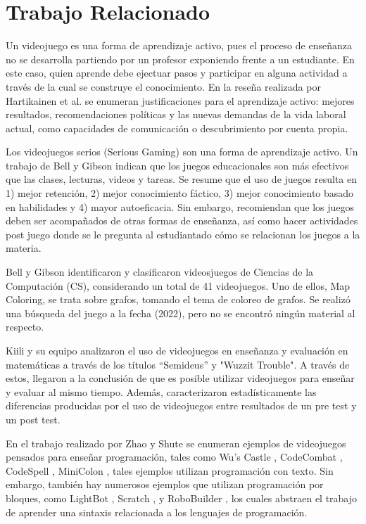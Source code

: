 \chapter{Trabajo Relacionado}


Un videojuego es una forma de aprendizaje activo, pues el proceso de enseñanza no se desarrolla partiendo por un profesor exponiendo frente a un estudiante. En este caso, quien aprende debe ejectuar pasos y participar en alguna actividad a través de la cual se construye el conocimiento. En la reseña realizada por Hartikainen et al. \cite{active_learning_review} se enumeran justificaciones para el aprendizaje activo:  mejores resultados, recomendaciones políticas y las nuevas demandas de la vida laboral actual, como capacidades de comunicación o descubrimiento por cuenta propia. 

Los videojuegos serios (Serious Gaming) son una forma de aprendizaje activo. Un trabajo de Bell y Gibson \cite{evaluation_of_games_for_teaching_cs} indican que los juegos educacionales son más efectivos que las clases, lecturas, videos y tareas. Se resume que el uso de juegos resulta en 1) mejor retención, 2) mejor conocimiento fáctico, 3) mejor conocimiento basado en habilidades y 4) mayor autoeficacia. Sin embargo, recomiendan que los juegos  deben ser acompañados de otras formas de enseñanza, así como hacer actividades post juego donde se le pregunta al estudiantado cómo se relacionan los juegos a la materia.

Bell y Gibson \cite{evaluation_of_games_for_teaching_cs} identificaron y clasificaron videosjuegos de Ciencias de la Computación (CS), considerando un total de 41 videojuegos. Uno de ellos, Map Coloring, se trata sobre grafos, tomando el tema de coloreo de grafos. Se realizó una búsqueda del juego a la fecha (2022), pero no se encontró ningún material al respecto.

Kiili y su equipo \cite{using_videogames_maths} analizaron el uso de videojuegos en enseñanza y evaluación en matemáticas a través de los títulos ``Semideus'' y "Wuzzit Trouble". A través de estos, llegaron a la conclusión de que es posible utilizar videojuegos para enseñar y evaluar al mismo tiempo. Además, caracterizaron estadísticamente las diferencias producidas por el uso de videojuegos entre resultados de un pre test y un post test.

En el trabajo realizado por Zhao y Shute \cite{video_game_foster_computational_thinking} se enumeran ejemplos de videojuegos pensados para enseñar programación, tales como Wu's Castle \cite{wuscastle}, CodeCombat \cite{CodeCombat}, CodeSpell \cite{codespells}, MiniColon \cite{minicolon}, tales ejemplos utilizan programación con texto. Sin embargo, también hay numerosos ejemplos que utilizan programación por bloques, como LightBot \cite{LightBot}, Scratch \cite{maloney2010scratch}, \cite{scratch} y RoboBuilder \cite{RoboBuilder}, los cuales abstraen el trabajo de aprender una sintaxis relacionada a los lenguajes de programación.

